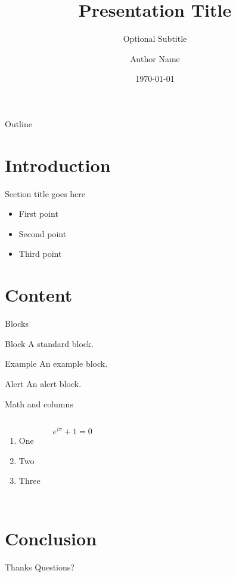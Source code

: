 \documentclass[aspectratio=43]{beamer}
\title{Presentation Title}
\subtitle{Optional Subtitle}
\author{Author Name}
\institute{Affiliation}
\date{\today}
\begin{document}
\begin{frame}
  \titlepage
\end{frame}

\begin{frame}{Outline}
  \tableofcontents
\end{frame}

\section{Introduction}

\begin{frame}{Section title goes here}
  \begin{itemize}
    \item First point
    \item Second point
    \item Third point
  \end{itemize}
\end{frame}

\section{Content}

\begin{frame}{Blocks}
  \begin{block}{Block}
    A standard block.
  \end{block}

  \begin{exampleblock}{Example}
    An example block.
  \end{exampleblock}

  \begin{alertblock}{Alert}
    An alert block.
  \end{alertblock}
\end{frame}

\begin{frame}{Math and columns}
  \begin{columns}
      \begin{enumerate}
        \item One
        \item Two
        \item Three
      \end{enumerate}
      \[
        e^{i\pi} + 1 = 0
      \]
  \end{columns}
\end{frame}

\section{Conclusion}

\begin{frame}{Thanks}
  \centering\Large Questions?
\end{frame}
\end{document}
